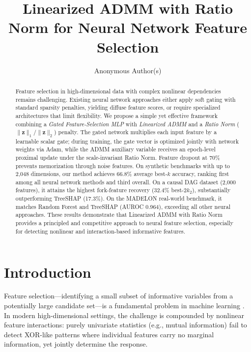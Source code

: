 \documentclass{uai2026} %
\title{Linearized ADMM with Ratio Norm for Neural Network Feature Selection}
\author[1]{Anonymous Author(s)}
\affil[1]{Anonymous Institution}
\theoremstyle{definition}
\theoremstyle{remark}
\newcommand{\bz}{\mathbf{z}}
\begin{document}
\maketitle

\begin{abstract}
Feature selection in high-dimensional data with complex nonlinear dependencies remains challenging.
Existing neural network approaches either apply soft gating with standard sparsity penalties, yielding diffuse feature scores, or require specialized architectures that limit flexibility.
We propose a simple yet effective framework combining a \emph{Gated Feature-Selection MLP} with \emph{Linearized ADMM} and a \emph{Ratio Norm} ($\lVert\bz\rVert_1/\lVert\bz\rVert_2$) penalty.
The gated network multiplies each input feature by a learnable scalar gate; during training, the gate vector is optimized jointly with network weights via Adam, while the ADMM auxiliary variable receives an epoch-level proximal update under the scale-invariant Ratio Norm.
Feature dropout at 70\% prevents memorization through noise features.
On synthetic benchmarks with up to 2{,}048 dimensions, our method achieves 66.8\% average best-$k$ accuracy, ranking first among all neural network methods and third overall.
On a causal DAG dataset (2{,}000 features), it attains the highest fork-feature recovery (32.4\% best-$2k_2$), substantially outperforming TreeSHAP (17.3\%).
On the MADELON real-world benchmark, it matches Random Forest and TreeSHAP (AUROC 0.964), exceeding all other neural approaches.
These results demonstrate that Linearized ADMM with Ratio Norm provides a principled and competitive approach to neural feature selection, especially for detecting nonlinear and interaction-based informative features.
\end{abstract}

\section{Introduction}\label{sec:intro}

Feature selection---identifying a small subset of informative variables from a potentially large candidate set---is a fundamental problem in machine learning \citep{guyon2003introduction, li2018feature}.
In modern high-dimensional settings, the challenge is compounded by nonlinear feature interactions: purely univariate statistics (e.g., mutual information) fail to detect XOR-like patterns where individual features carry no marginal information, yet jointly determine the response.
\end{document}
